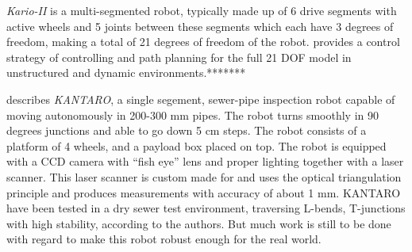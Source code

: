 \emph{Kario-II} is a multi-segmented robot, typically made up of 6 drive segments with
active wheels and 5 joints between these segments which each have 3 degrees of freedom,
making a total of 21 degrees of freedom of the robot. \cite{Kairo-II} provides a control
strategy of controlling and path planning for the full 21 DOF model in unstructured and
dynamic environments.******* 


\cite{KANTARO} describes \emph{KANTARO}, a single segement, sewer-pipe inspection robot 
capable of moving autonomously in 200-300 mm pipes. The robot turns smoothly in 90 degrees 
junctions and able to go down 5 cm steps. The robot consists of a platform of 4 wheels,
and a payload box placed on top. The robot is equipped with a CCD camera with ``fish eye''
lens and proper lighting together with a laser scanner. This laser scanner is custom made
for and uses the optical triangulation principle and produces measurements with accuracy
of about 1 mm. KANTARO have been tested in a dry sewer test environment, traversing
L-bends, T-junctions with high stability, according to the authors. But much work is still
to be done with regard to make this robot robust enough for the real world. 

\cite{KURT}




